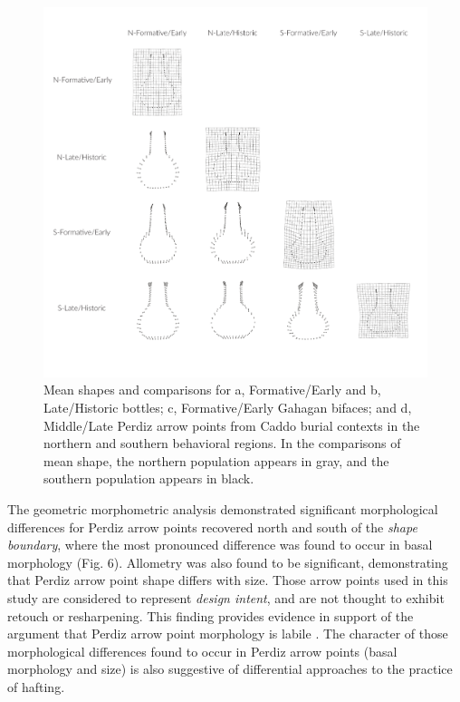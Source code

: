 \documentclass[smallextended]{svjour3}       %
\begin{document}
\begin{figure}
\includegraphics[width=1\linewidth]{ms-figs/figure6} \caption{Mean shapes and comparisons for a, Formative/Early and b, Late/Historic bottles; c, Formative/Early Gahagan bifaces; and d, Middle/Late Perdiz arrow points from Caddo burial contexts in the northern and southern behavioral regions. In the comparisons of mean shape, the northern population appears in gray, and the southern population appears in black.}\label{fig:fig5}
\end{figure}

The geometric morphometric analysis demonstrated significant
morphological differences for Perdiz arrow points recovered north and
south of the \emph{shape boundary}, where the most pronounced difference
was found to occur in basal morphology (Fig. 6). Allometry was also
found to be significant, demonstrating that Perdiz arrow point shape
differs with size. Those arrow points used in this study are considered
to represent \emph{design intent}, and are not thought to exhibit
retouch or resharpening. This finding provides evidence in support of
the argument that Perdiz arrow point morphology is labile \cite{RN9364}.
The character of those morphological differences found to occur in
Perdiz arrow points (basal morphology and size) is also suggestive of
differential approaches to the practice of hafting.
\end{document}
